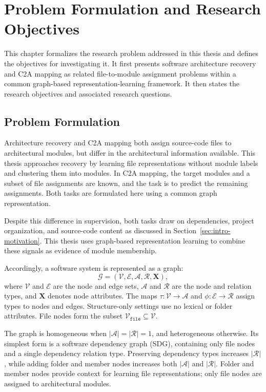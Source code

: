 \chapter{Problem Formulation and Research Objectives \label{ch:research_objective}}
\chaptertoc

This chapter formalizes the research problem addressed in this thesis and defines the objectives for investigating it. It first presents software architecture recovery and C2A mapping as related file-to-module assignment problems within a common graph-based representation-learning framework. It then states the research objectives and associated research questions.

\section{Problem Formulation}
\label{sec:problem-formulation}
Architecture recovery and C2A mapping both assign source-code files to architectural modules, but differ in the architectural information available. This thesis approaches recovery by learning file representations without module labels and clustering them into modules. In C2A mapping, the target modules and a subset of file assignments are known, and the task is to predict the remaining assignments. Both tasks are formulated here using a common graph representation.

Despite this difference in supervision, both tasks draw on dependencies, project organization, and source-code content as discussed in Section~\ref{sec:intro-motivation}. This thesis uses graph-based representation learning to combine these signals as evidence of module membership.

Accordingly, a software system is represented as a graph:
\begin{equation}
\mathcal{G} = (\mathcal{V}, \mathcal{E}, \mathcal{A}, \mathcal{R}, \mathbf{X}),
\label{eq:software_graph}
\end{equation}
where $\mathcal{V}$ and $\mathcal{E}$ are the node and edge sets, $\mathcal{A}$ and $\mathcal{R}$ are the node and relation types, and $\mathbf{X}$ denotes node attributes. The maps $\tau: \mathcal{V} \rightarrow \mathcal{A}$ and $\phi: \mathcal{E} \rightarrow \mathcal{R}$ assign types to nodes and edges. Structure-only settings use no lexical or folder attributes. File nodes form the subset $\mathcal{V}_{\texttt{file}} \subseteq \mathcal{V}$.

The graph is homogeneous when $|\mathcal{A}| = |\mathcal{R}| = 1$, and heterogeneous otherwise. Its simplest form is a software dependency graph (SDG), containing only file nodes and a single dependency relation type. Preserving dependency types increases $|\mathcal{R}|$, while adding folder and member nodes increases both $|\mathcal{A}|$ and $|\mathcal{R}|$. Folder and member nodes provide context for learning file representations; only file nodes are assigned to architectural modules.


